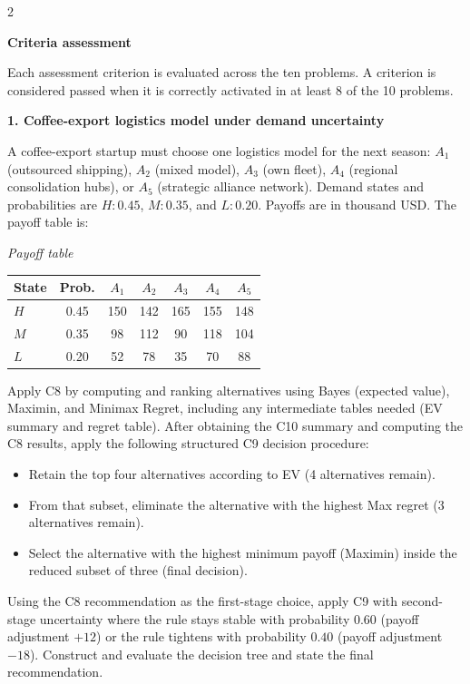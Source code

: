 \documentclass[12pt]{article}
\newcommand{\SubsectionBox}[1]{%
	\noindent\colorbox{gray!30}{%
		\parbox{\linewidth}{\textbf{#1}}%
	}\par\vspace{0.35cm}%
}
\begin{document}
	\begin{multicols}{2}
		\SubsectionBox{Criteria assessment}\vspace{-0.25cm}
		Each assessment criterion is evaluated across the ten problems. A criterion is considered passed when it is correctly activated in at least 8 of the 10 problems.
		
		\vspace{0.25cm}
		\SubsectionBox{1. Coffee-export logistics model under demand uncertainty}\vspace{-0.25cm}
		A coffee-export startup must choose one logistics model for the next season: $A_1$ (outsourced shipping), $A_2$ (mixed model), $A_3$ (own fleet), $A_4$ (regional consolidation hubs), or $A_5$ (strategic alliance network).
		Demand states and probabilities are $H:0.45$, $M:0.35$, and $L:0.20$. Payoffs are in thousand USD. The payoff table is:
		
		\begin{center}
			\textit{Payoff table} \\
			\begin{tabular}{l c c c c c c}
				\hline
				State& Prob. & $A_1$ & $A_2$ & $A_3$ & $A_4$ & $A_5$ \\
				\hline
				$H$ & 0.45 & 150 & 142 & 165 & 155 & 148 \\
				$M$ & 0.35 & 98 & 112 & 90 & 118 & 104 \\
				$L$ & 0.20 & 52 & 78 & 35 & 70 & 88 \\
				\hline
			\end{tabular}
		\end{center}
		
		Apply C8 by computing and ranking alternatives using Bayes (expected value), Maximin, and Minimax Regret, including any intermediate tables needed (EV summary and regret table).
		After obtaining the C10 summary and computing the C8 results, apply the following structured C9 decision procedure:
		\begin{itemize}
			\item Retain the top four alternatives according to EV (4 alternatives remain).
			\item From that subset, eliminate the alternative with the highest Max regret (3 alternatives remain).
			\item Select the alternative with the highest minimum payoff (Maximin) inside the reduced subset of three (final decision).
		\end{itemize}
		Using the C8 recommendation as the first-stage choice, apply C9 with second-stage uncertainty where the rule stays stable with probability $0.60$ (payoff adjustment $+12$) or the rule tightens with probability $0.40$ (payoff adjustment $-18$). Construct and evaluate the decision tree and state the final recommendation.
		

\end{multicols}
\end{document}
